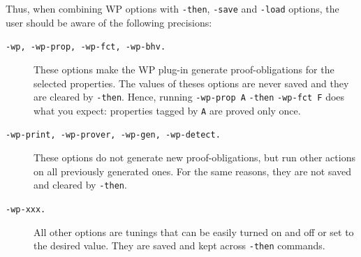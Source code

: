 Thus, when combining \textsf{WP}
options with \texttt{-then}, \texttt{-save} and \texttt{-load}
options, the user should be aware of the following precisions:
\begin{description}
\item[\tt -wp, -wp-prop, -wp-fct, -wp-bhv.] These options make the
  \textsf{WP} plug-in generate proof-obligations for the selected
  properties. The values of theses options are never saved and they are
  cleared by \texttt{-then}. Hence, running \texttt{-wp-prop A}
  \texttt{-then} \texttt{-wp-fct F} does what you expect:
  properties tagged by \texttt{A} are proved only once.
\item[\tt -wp-print, -wp-prover, -wp-gen, -wp-detect.] These options do not
  generate new proof-obligations, but run other actions on all
  previously generated ones. For the same reasons, they are not saved
  and cleared by \texttt{-then}.
\item[\tt -wp-xxx.] All other options are tunings that can be easily
  turned on and off or set to the desired value.
  They are saved and kept across \texttt{-then} commands.
\end{description}


